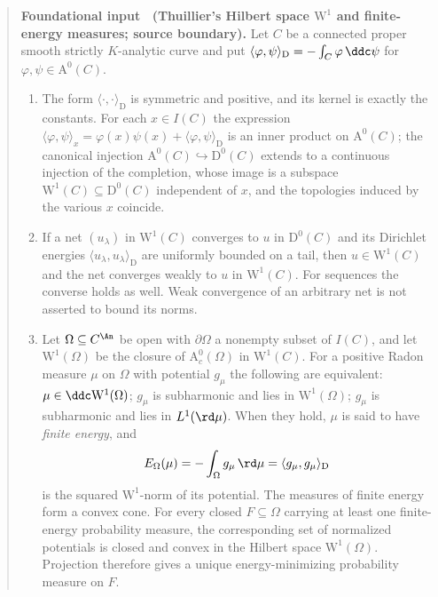 \label{thm:ch26-thuillier-w1}
\begin{quote}
\textbf{Foundational input \thetheorem\ (Thuillier's Hilbert space
$\mathrm W^1$ and finite-energy measures; source boundary).}
Let $C$ be a connected proper smooth strictly $K$-analytic curve and put
$\langle\varphi,\psi\rangle_{\mathrm D}=-\int_C\varphi\,\ddc\psi$ for
$\varphi,\psi\in\mathrm A^0(C)$.
\begin{enumerate}
\item\label{itm:ch26-thu:hilbert}
 The form $\langle\cdot,\cdot\rangle_{\mathrm D}$ is symmetric and
 positive, and its kernel is exactly the constants.  For each
 $x\in I(C)$ the expression
 $\langle\varphi,\psi\rangle_x=\varphi(x)\psi(x)
   +\langle\varphi,\psi\rangle_{\mathrm D}$
 is an inner product on $\mathrm A^0(C)$; the canonical injection
 $\mathrm A^0(C)\hookrightarrow\mathrm D^0(C)$ extends to a continuous
 injection of the completion, whose image is a subspace
 $\mathrm W^1(C)\subseteq\mathrm D^0(C)$ independent of $x$, and the
 topologies induced by the various $x$ coincide.
\item\label{itm:ch26-thu:criterion}
 If a net $(u_\lambda)$ in $\mathrm W^1(C)$ converges to $u$ in
 $\mathrm D^0(C)$ and its Dirichlet energies
 $\langle u_\lambda,u_\lambda\rangle_{\mathrm D}$ are uniformly bounded
 on a tail, then $u\in\mathrm W^1(C)$ and the net converges weakly to
 $u$ in $\mathrm W^1(C)$.  For sequences the converse holds as well.
 Weak convergence of an arbitrary net is not asserted to bound its norms.
\item\label{itm:ch26-thu:energy}
 Let $\Omega\subseteq C^{\An}$ be open with $\partial\Omega$ a nonempty
 subset of $I(C)$, and let $\mathrm W^1(\Omega)$ be the closure of
 $\mathrm A^0_c(\Omega)$ in $\mathrm W^1(C)$.  For a positive Radon
 measure $\mu$ on $\Omega$ with potential $g_\mu$ the following are
 equivalent: $\mu\in\ddc\mathrm W^1(\Omega)$; $g_\mu$ is subharmonic and
 lies in $\mathrm W^1(\Omega)$; $g_\mu$ is subharmonic and lies in
 $L^1(\rd\mu)$.  When they hold, $\mu$ is said to have \emph{finite
 energy}, and
 \[
  E_\Omega(\mu)=-\int_\Omega g_\mu\,\rd\mu
   =\langle g_\mu,g_\mu\rangle_{\mathrm D}
 \]
 is the squared $\mathrm W^1$-norm of its potential.  The measures of
 finite energy form a convex cone.  For every closed $F\subseteq\Omega$
 carrying at least one finite-energy probability measure, the corresponding
 set of normalized potentials is closed and convex in the Hilbert space
 $\mathrm W^1(\Omega)$.  Projection therefore gives a unique
 energy-minimizing probability measure on $F$.

\end{enumerate}
\end{quote}
